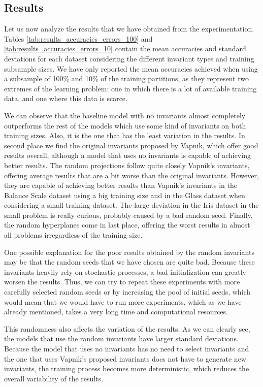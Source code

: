 \subsection{Results}

Let us now analyze the results that we have obtained from the experimentation. Tables
\ref{tab:results_accuracies_errors_100} and \ref{tab:results_accuracies_errors_10}
contain the mean accuracies and standard deviations for each dataset considering the different invariant types
and training subsample sizes. We have only reported the mean accuracies achieved when using a subsample
of 100\% and 10\% of the training partitions, as they represent two extremes of the learning problem: one in which
there is a lot of available training data, and one where this data is scarce.

We can observe that the baseline model with no invariants almost completely outperforms the rest of the
models which use some kind of invariants on both training sizes. Also, it is the one that has the
least variation in the results. In second place we find the original invariants proposed by Vapnik, which
offer good results overall, although a model that uses no invariants is capable of achieving better results.
The random projections follow quite closely Vapnik's invariants, offering average results that are a bit worse
than the original invariants. However, they are capable of achieving better results than Vapnik's invariants in
the Balance Scale dataset using a big training size and in the Glass dataset when considering a small training
dataset. The large deviation in the Iris dataset in the small problem is really curious, probably caused by a
bad random seed. Finally, the random hyperplanes come in last place, offering the worst results in almost all
problems irregardless of the training size.

One possible explanation for the poor results obtained by the random invariants may be that the random
seeds that we have chosen are quite bad. Because these invariants heavily rely on stochastic processes,
a bad initialization can greatly worsen the results. Thus, we can try to repeat these
experiments with more carefully selected random seeds or by increasing the pool of initial seeds, which
would mean that we would have to run more experiments, which as we have already mentioned, takes a very long
time and computational resources.

This randomness also affects the variation of the results. As we can clearly see, the models that use the
random invariants have larger standard deviations. Because the model that uses no invariants has no
need to select invariants and the one that uses Vapnik's proposed invariants does not have to generate new
invariants, the training process becomes more deterministic, which reduces the overall variability of the results.

